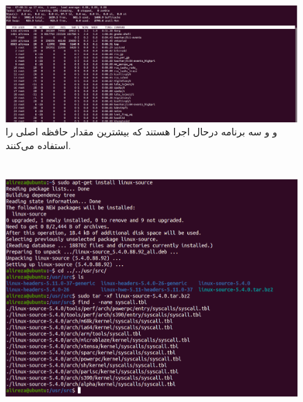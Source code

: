 \documentclass{article}
\begin{document}
\section{}
\begin{figure}[ht]
    \centering
    \includegraphics[width=1.0\textwidth]{figures/3.png}
    \caption
	{
و
و
سه برنامه درحال اجرا هستند که بیشترین مقدار حافظه اصلی را استفاده می‌کنند.
	}
    \label{fig:fig1}
\end{figure}
\FloatBarrier

\section{}
\subsection{}
\begin{figure}[ht]
    \centering
    \includegraphics[width=1.0\textwidth]{figures/a.png}
    \caption{}
    \label{fig:fig1}
\end{figure}
\FloatBarrier
\end{document}
